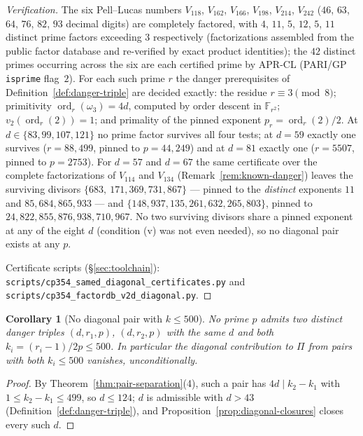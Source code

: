 \documentclass[11pt]{amsart}
\theoremstyle{plain}
\newtheorem{corollary}[theorem]{Corollary}
\theoremstyle{definition}
\theoremstyle{remark}
\numberwithin{equation}{section}
\newcommand{\ord}{\operatorname{ord}}
\newcommand{\F}{\mathbb{F}}
\begin{document}
\begin{proof}[Verification]
The six Pell--Lucas numbers $V_{118}$, $V_{162}$, $V_{166}$, $V_{198}$, $V_{214}$, $V_{242}$ ($46$, $63$, $64$, $76$, $82$, $93$ decimal digits) are completely factored, with $4$, $11$, $5$, $12$, $5$, $11$ distinct prime factors exceeding $3$ respectively (factorizations assembled from the public factor database \cite{ref:FactorDB} and re-verified by exact product identities); the $42$ distinct primes occurring across the six are each certified prime by APR-CL (PARI/GP \texttt{isprime} flag~$2$). For each such prime $r$ the danger prerequisites of Definition~\ref{def:danger-triple} are decided exactly: the residue $r \equiv 3 \pmod 8$; primitivity $\ord_r(\omega_3) = 4 d$, computed by order descent in $\F_{r^2}$; $v_2(\ord_r(2)) = 1$; and primality of the pinned exponent $p_r = \ord_r(2)/2$. At $d \in \{83, 99, 107, 121\}$ no prime factor survives all four tests; at $d = 59$ exactly one survives ($r = 88{,}499$, pinned to $p = 44{,}249$) and at $d = 81$ exactly one ($r = 5507$, pinned to $p = 2753$). For $d = 57$ and $d = 67$ the same certificate over the complete factorizations of $V_{114}$ and $V_{134}$ (Remark~\ref{rem:known-danger}) leaves the surviving divisors $\{683,\ 171{,}369{,}731{,}867\}$ --- pinned to the \emph{distinct} exponents $11$ and $85{,}684{,}865{,}933$ --- and $\{148{,}937{,}135{,}261{,}632{,}265{,}803\}$, pinned to $24{,}822{,}855{,}876{,}938{,}710{,}967$. No two surviving divisors share a pinned exponent at any of the eight $d$ (condition (v) was not even needed), so no diagonal pair exists at any $p$.
{\sloppy
Certificate scripts (\S\ref{sec:toolchain}): \texttt{scripts/}\allowbreak\texttt{cp354\_samed\_}\allowbreak\texttt{diagonal\_}\allowbreak\texttt{certificates.py} and \texttt{scripts/}\allowbreak\texttt{cp354\_factordb\_}\allowbreak\texttt{v2d\_}\allowbreak\texttt{diagonal.py}.\par}
\end{proof}

\begin{corollary}[No diagonal pair with $k \leq 500$]\label{cor:diagonal-k500}
No prime $p$ admits two distinct danger triples $(d, r_1, p)$, $(d, r_2, p)$ with the same $d$ and both $k_i = (r_i - 1)/2p \leq 500$. In particular the diagonal contribution to $\Pi$ from pairs with both $k_i \leq 500$ vanishes, unconditionally.
\end{corollary}

\begin{proof}
By Theorem~\ref{thm:pair-separation}(4), such a pair has $4 d \mid k_2 - k_1$ with $1 \leq k_2 - k_1 \leq 499$, so $d \leq 124$; $d$ is admissible with $d > 43$ (Definition~\ref{def:danger-triple}), and Proposition~\ref{prop:diagonal-closures} closes every such $d$.
\end{proof}
\end{document}
